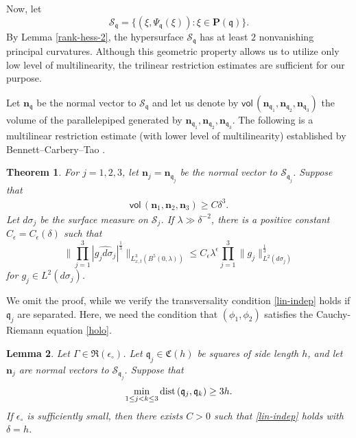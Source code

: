 \documentclass[10pt] %
{amsart}
\theoremstyle{plain}
\newtheorem{thm}{Theorem}[section]
\newtheorem{lem}[thm]{Lemma}
\numberwithin{equation}{section}
\newcommand{\dist} {\text{dist\! }}
\newcommand{\fq}{\mathfrak q}
\begin{document}
Now, let 
\[
\mathcal S_\fq = \{(\xi, \Psi_\fq(\xi)): \xi \in \mathbf P(\fq) \} .
\]
By Lemma \ref{rank-hess-2},
the hypersurface $\mathcal S_\fq $ has at least $2$ nonvanishing  principal curvatures.
Although this geometric property allows us to utilize only low level of multilinearity, the trilinear restriction estimates are sufficient for our purpose. 


Let $\mathbf n_\fq $ be the normal vector to $\mathcal S_\fq$ and let us denote by  $\textsf{vol}\,(\mathbf n_{\fq_1},\mathbf n_{\fq_2},\mathbf n_{\fq_3})$  the volume of the parallelepiped generated by $\mathbf n_{\fq_1},\mathbf n_{\fq_2},\mathbf n_{\fq_3}$.
The following  is a multilinear restriction estimate (with lower level of multilinearity) established by Bennett--Carbery--Tao \cite[Section 5]{BCT}.

\begin{thm}\label{thm:multi}  
For $j=1,2,3$, let $\mathbf n_j=\mathbf n_{\fq_j}$ be the normal vector to $\mathcal S_{\fq_j}$.  
Suppose that  
\begin{align}\label{lin-indep}
\textsf{vol}\,(\mathbf n_1 ,\mathbf n_2  , \mathbf n_3 )\ge  C \delta^3.
\end{align}
Let $d\sigma_j$ be the surface measure on $\mathcal S_j$. 
If $\lambda \gg \delta^{-2}$, there is a positive constant $C_\epsilon=C_\epsilon(\delta)$ such that
\[
\Big\|\prod_{j=1}^3 |\widehat{g_j d\sigma_j}  |^{\frac13} \Big\|_{L_{x,t}^3(B^5(0, \lambda))}
\le C_\epsilon \lambda^{\epsilon}\prod_{j=1}^3\|g_j\|_{L^2(d\sigma_j)}^{\frac13}  
\]
for $g_j \in L^2(d\sigma_j) $. 
\end{thm}


We omit the proof, while we verify the transversality condition \eqref{lin-indep} holds if $\fq_j$ are separated. Here, we need the condition that $(\phi_1,\phi_2)$ satisfies the Cauchy-Riemann equation \eqref{holo}. 




\begin{lem}\label{transv}
Let $\Gamma \in \mathfrak R(\epsilon_\circ)$. 
Let $\fq_j\in \mathfrak C(h)$ be squares of side length $h$, and let $\mathbf n_j$ are normal vectors to $\mathcal S_{\fq_j} $. 
Suppose that
\begin{align}\label{supp-sep}
\min_{1 \le j <k \le 3} \dist(\fq_j,\fq_k)\ge 3 h  .
\end{align}
If $\epsilon_\circ$ is sufficiently small, then there exists $C > 0$ such that \eqref{lin-indep}
holds with $\delta = h$.
\end{lem}
\end{document}
